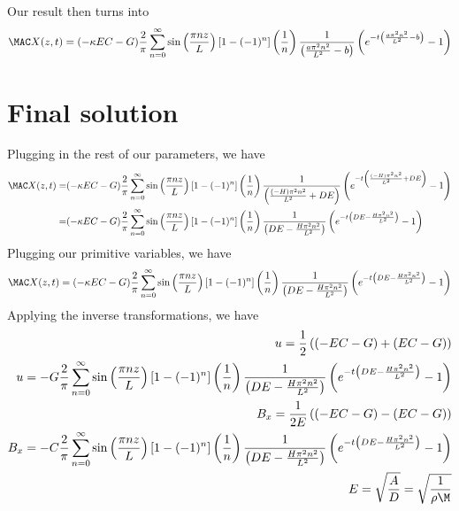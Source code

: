 \documentclass[11pt]{article}
\begin{document}
Our result then turns into
\begin{equation}\begin{aligned}
\MAC X(z,t) =  (- \kappa EC -G) \frac{2}{\pi} \sum_{n=0}^{\infty} \sin\left(\frac{\pi n z}{L}\right) [1-(-1)^n] \left( \frac{1}{n} \right) \frac{1}{\left(\frac{a\pi^2n^2}{L^2} - b\right)} \left( e^{-t\left(\frac{a\pi^2n^2}{L^2} - b\right)} - 1 \right) \\
\end{aligned} \end{equation}
\section{Final solution}
Plugging in the rest of our parameters, we have
\begin{equation}\begin{aligned}
\MAC X(z,t) = & (- \kappa EC -G) \frac{2}{\pi} \sum_{n=0}^{\infty} \sin\left(\frac{\pi n z}{L}\right) [1-(-1)^n] \left( \frac{1}{n} \right) \frac{1}{\left(\frac{(-H)\pi^2n^2}{L^2} + DE\right)} \left( e^{-t\left(\frac{(-H)\pi^2n^2}{L^2} + DE\right)} - 1 \right) \\
            = & (- \kappa EC -G) \frac{2}{\pi} \sum_{n=0}^{\infty} \sin\left(\frac{\pi n z}{L}\right) [1-(-1)^n] \left( \frac{1}{n} \right) \frac{1}{\left(DE - \frac{H\pi^2n^2}{L^2}\right)} \left( e^{-t\left(DE - \frac{H\pi^2n^2}{L^2}\right)} - 1 \right) \\
\end{aligned} \end{equation}
Plugging our primitive variables, we have
\begin{equation}\begin{aligned}
\MAC X(z,t) =  (- \kappa EC -G) \frac{2}{\pi} \sum_{n=0}^{\infty} \sin\left(\frac{\pi n z}{L}\right) [1-(-1)^n] \left( \frac{1}{n} \right) \frac{1}{\left(DE - \frac{H\pi^2n^2}{L^2}\right)} \left( e^{-t\left(DE - \frac{H\pi^2n^2}{L^2}\right)} - 1 \right) \\
\end{aligned} \end{equation}
Applying the inverse transformations, we have
\begin{equation}\begin{aligned}
u   = \frac{1}{2} \left( (- EC -G) + (EC -G) \right) \\
u   = -G \frac{2}{\pi} \sum_{n=0}^{\infty} \sin\left(\frac{\pi n z}{L}\right) [1-(-1)^n] \left( \frac{1}{n} \right) \frac{1}{\left(DE - \frac{H\pi^2n^2}{L^2}\right)} \left( e^{-t\left(DE - \frac{H\pi^2n^2}{L^2}\right)} - 1 \right) \\
B_x = \frac{1}{2E} \left( (-EC -G) - (EC -G) \right) \\
B_x = -C \frac{2}{\pi} \sum_{n=0}^{\infty} \sin\left(\frac{\pi n z}{L}\right) [1-(-1)^n] \left( \frac{1}{n} \right) \frac{1}{\left(DE - \frac{H\pi^2n^2}{L^2}\right)} \left( e^{-t\left(DE - \frac{H\pi^2n^2}{L^2}\right)} - 1 \right) \\
E = \sqrt{\frac{A}{D}} = \sqrt{\frac{1}{\rho \M}} \\
\end{aligned} \end{equation}
\end{document}
